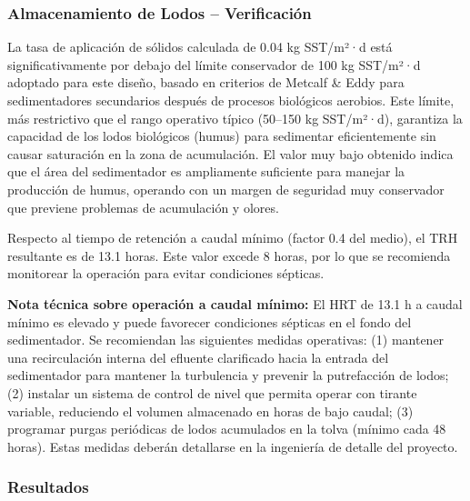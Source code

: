 \documentclass[12pt,a4paper]{article}
\begin{document}
\subsubsection{Almacenamiento de Lodos -- Verificación}

La tasa de aplicación de sólidos calculada de 0.04 kg SST/m²·d está significativamente por debajo del límite conservador de 100 kg SST/m²·d adoptado para este diseño, basado en criterios de Metcalf \& Eddy \cite{metcalf2014} para sedimentadores secundarios después de procesos biológicos aerobios. Este límite, más restrictivo que el rango operativo típico (50–150 kg SST/m²·d), garantiza la capacidad de los lodos biológicos (humus) para sedimentar eficientemente sin causar saturación en la zona de acumulación. El valor muy bajo obtenido indica que el área del sedimentador es ampliamente suficiente para manejar la producción de humus, operando con un margen de seguridad muy conservador que previene problemas de acumulación y olores.

Respecto al tiempo de retención a caudal mínimo (factor 0.4 del medio), el TRH resultante es de 13.1 horas. Este valor excede 8 horas, por lo que se recomienda monitorear la operación para evitar condiciones sépticas.

\textbf{Nota técnica sobre operación a caudal mínimo:} El HRT de 13.1 h a caudal mínimo es elevado y puede favorecer condiciones sépticas en el fondo del sedimentador. Se recomiendan las siguientes medidas operativas: (1) mantener una recirculación interna del efluente clarificado hacia la entrada del sedimentador para mantener la turbulencia y prevenir la putrefacción de lodos; (2) instalar un sistema de control de nivel que permita operar con tirante variable, reduciendo el volumen almacenado en horas de bajo caudal; (3) programar purgas periódicas de lodos acumulados en la tolva (mínimo cada 48 horas). Estas medidas deberán detallarse en la ingeniería de detalle del proyecto.

\subsubsection{Resultados}
\end{document}
